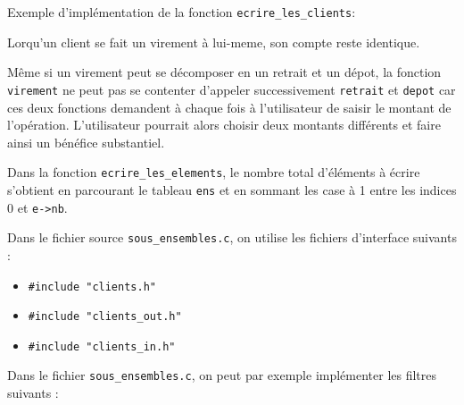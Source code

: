\documentclass[10pt]{article}
\begin{document}
\begin{enumerate}[label=\textbf{[\alph*]}]
\item Exemple d'implémentation de la fonction \texttt{ecrire\_les\_clients}:
  

\item Lorqu'un client se fait un virement à lui-meme, son compte reste
  identique.

\item Même si un virement peut se décomposer en un retrait et un
  dépot, la fonction \texttt{virement} ne peut pas se contenter
  d'appeler successivement \texttt{retrait} et \texttt{depot} car ces
  deux fonctions demandent à chaque fois à l'utilisateur de saisir le
  montant de l'opération. L'utilisateur pourrait alors choisir deux
  montants différents et faire ainsi un bénéfice substantiel.

\item Dans la fonction \texttt{ecrire\_les\_elements}, le nombre
  total d'éléments à écrire s'obtient en parcourant le tableau
  \texttt{ens} et en sommant les case à 1 entre les indices 0 et
  \texttt{e->nb}.

\item Dans le fichier source \texttt{sous\_ensembles.c}, on utilise les
  fichiers d'interface suivants :
  \begin{itemize}
  \item \texttt{\#include "clients.h"}
  \item \texttt{\#include "clients\_out.h"}
  \item \texttt{\#include "clients\_in.h"}
  \end{itemize}

\item Dans le fichier \texttt{sous\_ensembles.c}, on peut par exemple
  implémenter les filtres suivants :
  



\end{enumerate}
\end{document}
